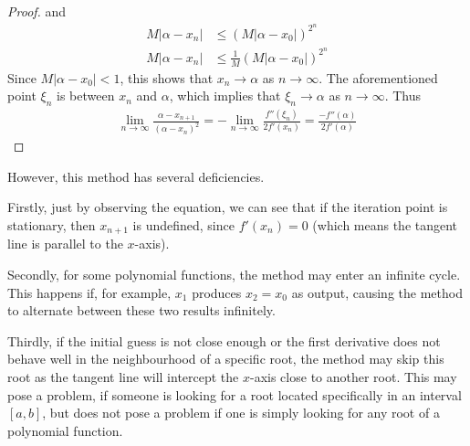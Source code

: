 \documentclass[
  digital, %
  table,   %
  nolof,     %
  nolot,     %
	draft, %
]{fithesis3}
\begin{document}
\begin{proof}
and
\begin{align}
  M\left|\alpha - x_{n}\right| &\leq (M\left|\alpha - x_{0}\right|)^{2^n} \\
	M\left|\alpha - x_{n}\right| &\leq \frac{1}{M}(M\left|\alpha - x_{0}\right|)^{2^n}
\end{align}
Since $M\left|\alpha-x_{0}\right| < 1$, this shows that $x_{n}\rightarrow\alpha$ as $n\rightarrow\infty$.
The aforementioned point $\xi_{n}$ is between $x_{n}$ and $\alpha$, which implies that $\xi_{n}\rightarrow\alpha$ as $n\rightarrow\infty$. Thus \parencite[p.~61]{rootApproxMeth}
\begin{align}
 \lim_{n\to\infty} \frac{\alpha - x_{n+1}}{(\alpha - x_{n})^2} = -\lim_{n\to\infty} \frac{f''(\xi_{n})}{2f'(x_{n})} = \frac{-f''(\alpha)}{2f'(\alpha)}
\end{align}
\end{proof}
However, this method has several deficiencies.

Firstly, just by observing the equation, we can see that if the iteration point is stationary, then $x_{n+1}$ is undefined, since $f'(x_{n}) = 0$ (which means the tangent line is parallel to the $x$-axis). 

Secondly, for some polynomial functions, the method may enter an infinite cycle. This happens if, for example, $x_{1}$ produces $x_{2} = x_{0}$ as output, causing the method to alternate between these two results infinitely.

Thirdly, if the initial guess is not close enough or the first derivative does not behave well in the neighbourhood of a specific root, the method may skip this root as the tangent line will intercept the $x$-axis close to another root. This may pose a problem, if someone is looking for a root located specifically in an interval $[a,b]$, but does not pose a problem if one is simply looking for any root of a polynomial function.
\end{document}
